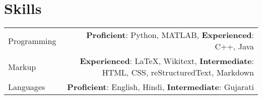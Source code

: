 \documentclass{article}
\begin{document}
\section*{Skills}

\begin{tabular}{L!{\vrule}R}
	Programming & \textbf{Proficient}: Python, MATLAB, \textbf{Experienced}: C++, Java\\
	Markup & \textbf{Experienced}: LaTeX, Wikitext, \textbf{Intermediate}:  HTML, CSS, reStructuredText, Markdown \\
	Languages & \textbf{Proficient}: English, Hindi, \textbf{Intermediate}: Gujarati
\end{tabular}


\end{document}

